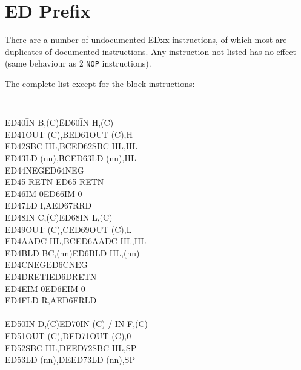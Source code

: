 \documentclass[oneside,a4paper]{book}
\begin{document}
\section{ED Prefix \cite{gerton}}

There are a number of undocumented EDxx instructions, of which most are duplicates of documented instructions. Any instruction not listed has no effect (same behaviour as 2 {\tt NOP} instructions).

The complete list except for the block instructions:

\renewcommand{\thefootnote}{\fnsymbol{footnote}}
{}
{\tt
	\begin{tabbing}
		{\qquad}ED40\quad\=IN B,(C)\qquad\qquad\=ED60\quad\=IN H,(C)\\ 
		{\qquad}ED41\>OUT (C),B\>ED61\>OUT (C),H\\ 
		{\qquad}ED42\>SBC HL,BC\>ED62\>SBC HL,HL\\  
		{\qquad}ED43\>LD (nn),BC\>ED63\>LD (nn),HL\\ 
		{\qquad}ED44\>NEG\>ED64\>NEG{\footnotemark[7]}\\ 
		{\qquad}ED45 \> RETN\> ED65\> RETN{\footnotemark[7]}\\
		{\qquad}ED46\>IM 0\>ED66\>IM 0{\footnotemark[7]}\\
		{\qquad}ED47\>LD I,A\>ED67\>RRD\\
		{\qquad}ED48\>IN C,(C)\>ED68\>IN L,(C)\\
		{\qquad}ED49\>OUT (C),C\>ED69\>OUT (C),L\\
		{\qquad}ED4A\>ADC HL,BC\>ED6A\>ADC HL,HL\\
		{\qquad}ED4B\>LD BC,(nn)\>ED6B\>LD HL,(nn)\\
		{\qquad}ED4C\>NEG{\footnotemark[7]}\>ED6C\>NEG{\footnotemark[7]}\\
		{\qquad}ED4D\>RETI\>ED6D\>RETN\footnotemark[7]\\
		{\qquad}ED4E\>IM 0{\footnotemark[7]}\>ED6E\>IM 0{\footnotemark[7]}\\
		{\qquad}ED4F\>LD R,A\>ED6F\>RLD\\
		{\qquad}\\
		{\qquad}ED50\>IN D,(C)\>ED70\>IN (C) / IN F,(C){\footnotemark[7]}\\
		{\qquad}ED51\>OUT (C),D\>ED71\>OUT (C),0{\footnotemark[7]}\\
		{\qquad}ED52\>SBC HL,DE\>ED72\>SBC HL,SP\\
		{\qquad}ED53\>LD (nn),DE\>ED73\>LD (nn),SP\\

\end{tabbing}}
\end{document}
